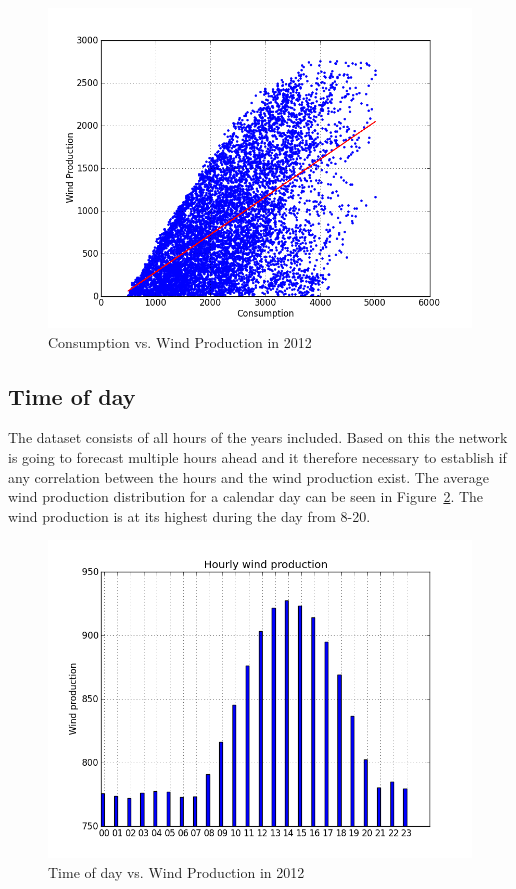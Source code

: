 \begin{figure}[H]
\centering
\includegraphics[width=0.99\linewidth,natwidth=898,natheight=587]{billeder/consumptionVsWindProduction.png}
\caption{Consumption vs. Wind Production in 2012}
\label{fig:consumptionVsWindProduction}
\end{figure}

\subsection{Time of day}
The dataset consists of all hours of the years included. Based on this the network is going to forecast multiple hours ahead and it therefore necessary to establish if any correlation between the hours and the wind production exist. The average wind production distribution for a calendar day can be seen in Figure~\ref{fig:hourly_wind_production}. The wind production is at its highest during the day from 8-20.  

\begin{figure}[H]
\centering
\includegraphics[width=0.99\linewidth,natwidth=898,natheight=587]{billeder/hourly_wind_production.png}
\caption{Time of day vs. Wind Production in 2012}
\label{fig:hourly_wind_production}
\end{figure}

